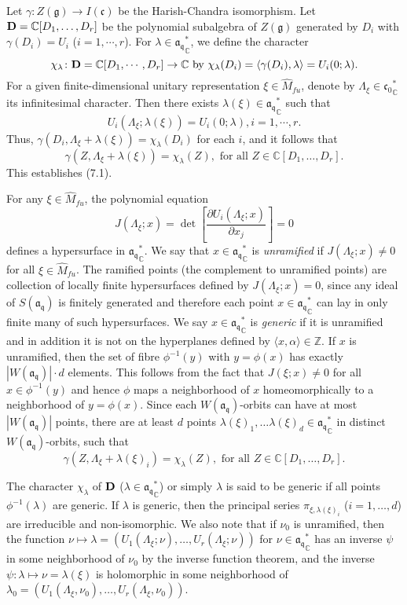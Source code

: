 \documentclass[a4paper]{amsart}
\theoremstyle{plain}
\theoremstyle{definition}
\def\det{\operatorname{det}}
\newcommand{\fra}{\mathfrak{a}}
\newcommand{\frc}{\mathfrak{c}}
\newcommand{\frg}{\mathfrak{g}}
\newcommand{\frq}{\mathfrak{q}}
\newcommand{\bbC}{\mathbb{C}}
\newcommand{\bbZ}{\mathbb{Z}}
\newcommand{\del}{\partial}
\begin{document}
Let $\gamma\colon Z(\frg)\rightarrow I(\frc)$ be the Harish-Chandra isomorphism.
Let ${\bf D}=\bbC[D_1,\ldots ,D_r]$ be the polynomial subalgebra of $Z(\frg)$
generated by $D_i$ with $\gamma(D_i)=U_i$ ($i=1,\cdots, r$).
For  $\lambda \in {\fra_\frq}_\bbC^*$,
we define the character
$$\chi_\lambda\colon {\bf D}=\bbC[D_1,\cdots , D_r]\rightarrow \bbC \text{ by }\chi_\lambda(D_i)=\langle\gamma(D_i),\lambda\rangle=U_i(0;\lambda).$$ For a given
finite-dimensional unitary representation $\xi\in  \widehat{M}_{fu}$, denote by
$\Lambda_\xi\in {\frc_0}^*_\bbC$ its infinitesimal character.  Then there exists $\lambda(\xi)\in {\fra_\frq}^*_\bbC$ such that
$$U_i(\Lambda_\xi;\lambda(\xi))=U_i(0;\lambda), i=1,\cdots, r.$$  Thus,  $\gamma(D_i,\Lambda_\xi+\lambda(\xi))=\chi_\lambda(D_i)$
 for each $i$, and it follows that
$$\gamma(Z,\Lambda_\xi+\lambda(\xi))=\chi_\lambda(Z), \text{\ for all } Z\in \bbC[D_1,\ldots, D_r].$$
This establishes (7.1).

For any $\xi\in  \widehat{M}_{fu}$, the polynomial equation
$$ J(\Lambda_\xi;x)=\det\left[ \frac{\del U_i(\Lambda_\xi;x)}{\del x_j} \right]=0$$ 
defines a hypersurface in
${\fra_\frq}^*_\bbC$.  We say that $x\in {\fra_\frq}^*_\bbC$ is {\it unramified} if
$J(\Lambda_\xi;x)\neq 0$ for all $\xi\in \widehat{M}_{fu}$.  The ramified points (the complement to
unramified points) are collection of locally finite hypersurfaces defined by $J(\Lambda_\xi;x)=0$, since
any ideal of $S(\fra_\frq)$ is finitely generated and therefore each point $x\in {\fra_\frq}^*_\bbC$ can
lay in only finite many of such hypersurfaces.
We say $x\in {\fra_\frq}^*_\bbC$ is {\it generic} if it is unramified and in addition it is not on the hyperplanes
defined by $\langle x,\alpha \rangle \in \bbZ$.
If $x$ is unramified, then the set of fibre $\phi^{-1}(y)$ with $y=\phi(x)$ has exactly $|W(\fra_\frq)|\cdot d$ elements.
This follows from the fact that $J(\xi;x)\neq 0$ for all $x\in \phi^{-1}(y)$
and hence $\phi$ maps a neighborhood of $x$ homeomorphically
to a neighborhood of $y=\phi(x)$.  Since each $W(\fra_\frq)$-orbits can have at most $|W(\fra_\frq)|$ points, there are at least
$d$ points $\lambda(\xi)_1,\ldots \lambda(\xi)_d\in {\fra_\frq}^*_\bbC$
in distinct $W(\fra_\frq)$-orbits, such that
$$\gamma(Z,\Lambda_\xi+\lambda(\xi)_i)=\chi_\lambda(Z), \text{\ for all } Z\in \bbC[D_1,\ldots, D_r].$$

The character $\chi_\lambda$ of $\bf D$ ($\lambda\in {\fra_\frq}^*_\bbC$) or simply
$\lambda$ is said to be generic if all points  $\phi^{-1}(\lambda)$ are generic. 
If $\lambda$ is generic, then the principal series $\pi_{\xi,\lambda(\xi)_i}$ ($i=1,\ldots ,d$)
are irreducible and non-isomorphic.  We also note that
if  $\nu_0$ is unramified, then the function $\nu\mapsto \lambda=(U_1(\Lambda_\xi;\nu),\ldots,U_r(\Lambda_\xi;\nu))$
for  $\nu\in {\fra_\frq}^*_\bbC$
has an inverse $\psi$ in some neighborhood of $\nu_0$
by the inverse function theorem, and
the inverse $\psi\colon\lambda \mapsto \nu=\lambda(\xi)$ is holomorphic in some neighborhood of
$\lambda_0=(U_1(\Lambda_\xi,\nu_0), \ldots, U_r(\Lambda_\xi,\nu_0))$.
\end{document}
